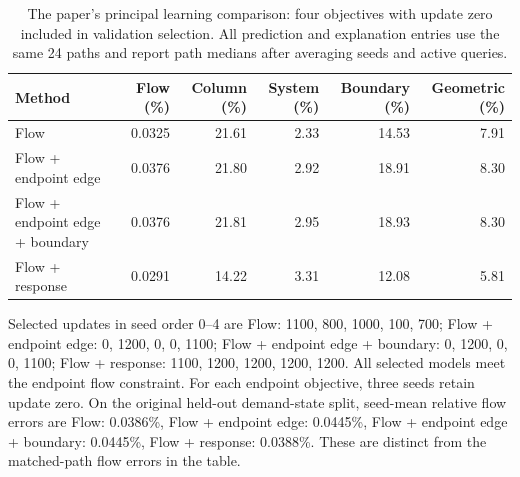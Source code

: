 \begin{table}[t]\centering\small
\caption{The paper's principal learning comparison: four objectives with update zero included in validation selection. All prediction and explanation entries use the same 24 paths and report path medians after averaging seeds and active queries.}
\label{tab:pairs-v102}
\begin{tabular}{lrrrrr}\toprule Method & Flow (\%) & Column (\%) & System (\%) & Boundary (\%) & Geometric (\%)\\\midrule
Flow & 0.0325 & 21.61 & 2.33 & 14.53 & 7.91\\
Flow + endpoint edge & 0.0376 & 21.80 & 2.92 & 18.91 & 8.30\\
Flow + endpoint edge + boundary & 0.0376 & 21.81 & 2.95 & 18.93 & 8.30\\
Flow + response & 0.0291 & 14.22 & 3.31 & 12.08 & 5.81\\
\bottomrule\end{tabular}\end{table}
Selected updates in seed order 0--4 are Flow: 1100, 800, 1000, 100, 700; Flow + endpoint edge: 0, 1200, 0, 0, 1100; Flow + endpoint edge + boundary: 0, 1200, 0, 0, 1100; Flow + response: 1100, 1200, 1200, 1200, 1200. All selected models meet the endpoint flow constraint. For each endpoint objective, three seeds retain update zero.
On the original held-out demand-state split, seed-mean relative flow errors are Flow: 0.0386\%, Flow + endpoint edge: 0.0445\%, Flow + endpoint edge + boundary: 0.0445\%, Flow + response: 0.0388\%. These are distinct from the matched-path flow errors in the table.
